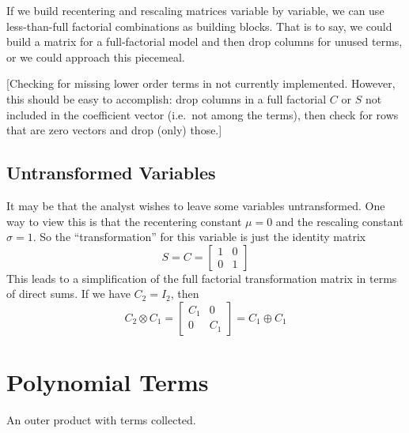 \documentclass[]{article}
\begin{document}
If we build recentering and rescaling matrices variable by variable, we
can use less-than-full factorial combinations as building blocks. That
is to say, we could build a matrix for a full-factorial model and then
drop columns for unused terms, or we could approach this piecemeal.

{[}Checking for missing lower order terms in not currently implemented.
However, this should be easy to accomplish: drop columns in a full
factorial \(C\) or \(S\) not included in the coefficient vector
(i.e.~not among the terms), then check for rows that are zero vectors
and drop (only) those.{]}

\subsection{Untransformed Variables}\label{untransformed-variables}

It may be that the analyst wishes to leave some variables untransformed.
One way to view this is that the recentering constant \(\mu=0\) and the
rescaling constant \(\sigma=1\). So the ``transformation'' for this
variable is just the identity matrix
\[S=C=\begin{bmatrix}1 & 0 \\ 0 &1 \end{bmatrix}\] This leads to a
simplification of the full factorial transformation matrix in terms of
direct sums. If we have \(C_2=I_2\), then
\[C_2 \otimes C_1 = \begin{bmatrix}C_1 &0 \\ 0 &C_1\end{bmatrix} = C_1 \oplus C_1 \]

\section{Polynomial Terms}\label{polynomial-terms}

An outer product with terms collected.
\end{document}
